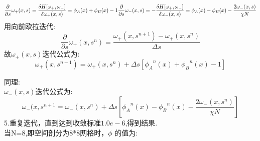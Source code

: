 \documentclass[12pt]{article}
\begin{document}
\begin{CJK}{UTF8}{gkai}
     \begin{equation}    
     \frac{\partial}{\partial s}\omega_+(x,s)=\frac{\delta H[\omega_+,\omega_-]}{\delta \omega_+(x,s)}=\phi _A(x)+\phi _B(x)-1\\
     \frac{\partial}{\partial s}\omega_-(x,s)=-\frac{\delta H[\omega_+,\omega_-]}{\delta \omega_-(x,s)}=\phi _A(x)-\phi _B(x)-\frac{2\omega_-(x,s)}{\chi N} 
     \end{equation}
     用向前欧拉迭代:\\
     
     $$\frac{\partial}{\partial s}\omega_+(x,s^n)=\dfrac{\omega_+(x,s^{n+1})-\omega_+(x,s^{n})}{\Delta s}$$
     故$\omega_+(x,s)$迭代公式为:\\
     $$\omega_+(x,s^{n+1})=\omega_+(x,s^n)+\Delta s[{\phi _A}^n(x)+{\phi _B}^n(x)-1]$$
     
     同理:\\
     
     $\omega_-(x,s)$迭代公式为:\\
     $$\omega_-(x,s^{n+1}=\omega_-(x,s^n)+\Delta s[{\phi _A}^n(x)-{\phi _B}^n(x)-\frac{2\omega_-(x,s^n)}{\chi N}]$$
     5.重复迭代，直到达到收敛标准$1.0e-6$,得到结果.\\
     
    当N=8,即空间剖分为8*8网格时，$\phi$ 的值为:
    \begin{table}[H]
    	\centering
    	\begin{tabular}{ccccccccc}
    		

\end{tabular}
\end{table}
\end{CJK}
\end{document}
